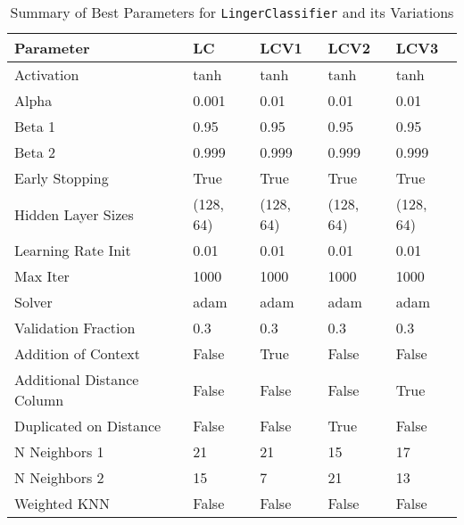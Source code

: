 \documentclass[a4paper, 12pt]{report}
\begin{document}
\begin{table}[H]
    \centering
    \caption{Summary of Best Parameters for \texttt{LingerClassifier} and its Variations}
    \label{tab:best_parameters_summary_exp5}
    \begin{tabular}{|l|l|l|l|l|}
    \hline
    \textbf{Parameter} & \textbf{LC} & \textbf{LCV1} & \textbf{LCV2} & \textbf{LCV3} \\
    \hline
    Activation & tanh & tanh & tanh & tanh \\
    Alpha & 0.001 & 0.01 & 0.01 & 0.01 \\
    Beta 1 & 0.95 & 0.95 & 0.95 & 0.95 \\
    Beta 2 & 0.999 & 0.999 & 0.999 & 0.999 \\
    Early Stopping & True & True & True & True \\
    Hidden Layer Sizes & (128, 64) & (128, 64) & (128, 64) & (128, 64) \\
    Learning Rate Init & 0.01 & 0.01 & 0.01 & 0.01 \\
    Max Iter & 1000 & 1000 & 1000 & 1000 \\
    Solver & adam & adam & adam & adam \\
    Validation Fraction & 0.3 & 0.3 & 0.3 & 0.3 \\
    Addition of Context & False & True & False & False \\
    Additional Distance Column & False & False & False & True \\
    Duplicated on Distance & False & False & True & False \\
    N Neighbors 1 & 21 & 21 & 15 & 17 \\
    N Neighbors 2 & 15 & 7 & 21 & 13 \\
    Weighted KNN & False & False & False & False \\
    \hline
    \end{tabular}
\end{table}
\clearpage
\end{document}
